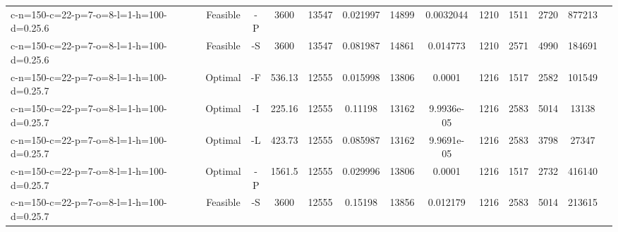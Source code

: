 \documentclass[landscape, a4paper]{article}
\begin{document}
\begin{center}
\begin{tabular}{lcccccccccccc}
c-n=150-c=22-p=7-o=8-l=1-h=100-d=0.25.6 & Feasible & -P & 3600 & 13547 & 0.021997 & 14899 & 0.0032044 & 1210 & 1511 & 2720 & 877213 & \\
c-n=150-c=22-p=7-o=8-l=1-h=100-d=0.25.6 & Feasible & -S & 3600 & 13547 & 0.081987 & 14861 & 0.014773 & 1210 & 2571 & 4990 & 184691 & \\
c-n=150-c=22-p=7-o=8-l=1-h=100-d=0.25.7 & Optimal & -F & 536.13 & 12555 & 0.015998 & 13806 & 0.0001 & 1216 & 1517 & 2582 & 101549 & \\
c-n=150-c=22-p=7-o=8-l=1-h=100-d=0.25.7 & Optimal & -I & 225.16 & 12555 & 0.11198 & 13162 & 9.9936e-05 & 1216 & 2583 & 5014 & 13138 & \\
c-n=150-c=22-p=7-o=8-l=1-h=100-d=0.25.7 & Optimal & -L & 423.73 & 12555 & 0.085987 & 13162 & 9.9691e-05 & 1216 & 2583 & 3798 & 27347 & \\
c-n=150-c=22-p=7-o=8-l=1-h=100-d=0.25.7 & Optimal & -P & 1561.5 & 12555 & 0.029996 & 13806 & 0.0001 & 1216 & 1517 & 2732 & 416140 & \\
c-n=150-c=22-p=7-o=8-l=1-h=100-d=0.25.7 & Feasible & -S & 3600 & 12555 & 0.15198 & 13856 & 0.012179 & 1216 & 2583 & 5014 & 213615 & \\
\end{tabular}
\end{center}
\end{document}
